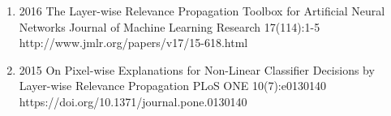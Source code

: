 \documentclass[10pt,a4paper]{article} %
\begin{document}
{\begin{enumerate}
    \item[] 
                        {2016}
                        {The Layer-wise Relevance Propagation Toolbox for Artificial Neural Networks}
                        {Journal of Machine Learning Research}
                        {17(114):1-5}
                        {http://www.jmlr.org/papers/v17/15-618.html}

    \item[] 
                        {2015}
                        {On Pixel-wise Explanations for Non-Linear Classifier Decisions by Layer-wise Relevance Propagation}
                        {PLoS ONE}
                        {10(7):e0130140}
                        {https://doi.org/10.1371/journal.pone.0130140}
\end{enumerate}
}
\end{document}
